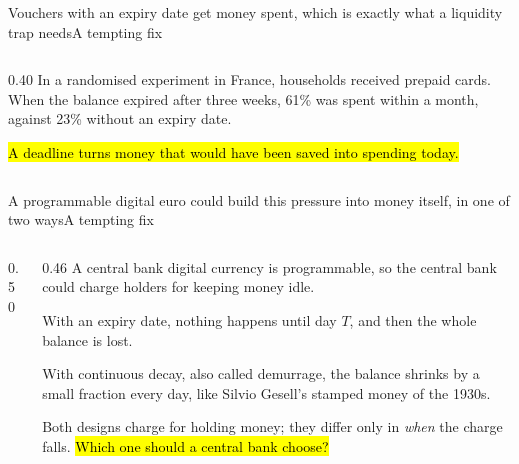 \documentclass[aspectratio=169,9pt]{beamer}
\begin{document}
\begin{frame}{Vouchers with an expiry date get money spent, which is exactly what a liquidity trap needs}{A tempting fix}
\begin{columns}[T]
\begin{column}{0.40\textwidth}
      \vspace{0.6em}
      In a randomised experiment in France, households received prepaid cards. When the balance expired after three weeks, 61\% was spent within a month, against 23\% without an expiry date.

      \vspace{0.6em}
      \hl{A deadline turns money that would have been saved into spending today.}
    \end{column}
  \end{columns}
\end{frame}

\begin{frame}{A programmable digital euro could build this pressure into money itself, in one of two ways}{A tempting fix}
  \begin{columns}[c]
    \begin{column}{0.50\textwidth}
    \end{column}
    \begin{column}{0.46\textwidth}
      \small
      A central bank digital currency is programmable, so the central bank could charge holders for keeping money idle.

      \vspace{0.6em}
      With an \textcolor{warm}{expiry date}, nothing happens until day $T$, and then the whole balance is lost.

      \vspace{0.6em}
      With \textcolor{accent}{continuous decay}, also called demurrage, the balance shrinks by a small fraction every day, like Silvio Gesell's stamped money of the 1930s.

      \vspace{0.6em}
      Both designs charge for holding money; they differ only in \emph{when} the charge falls.
      \hl{Which one should a central bank choose?}
    \end{column}
  \end{columns}
\end{frame}
\end{document}
